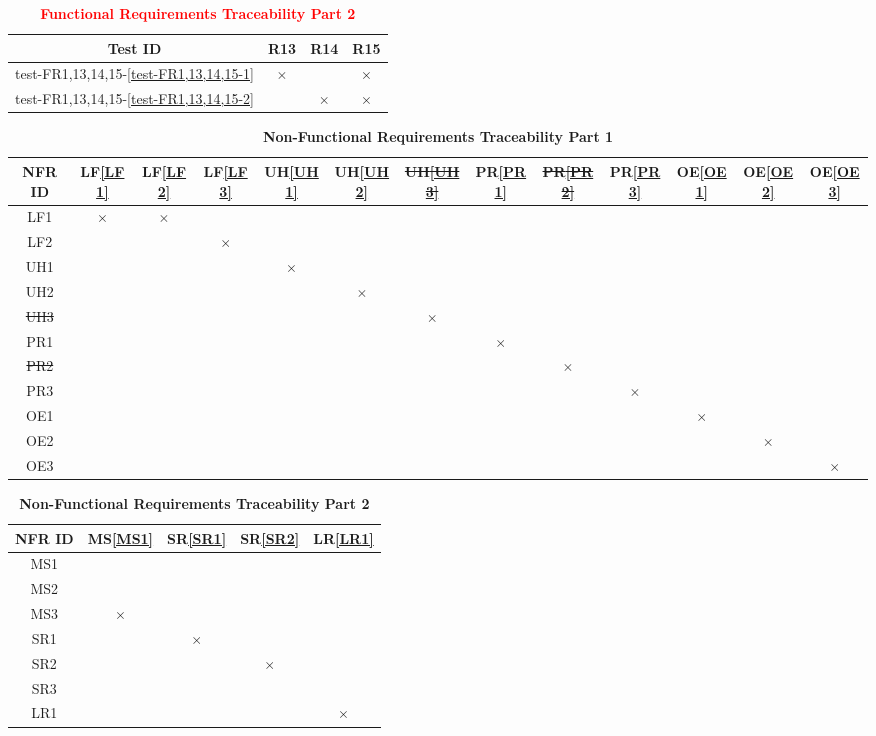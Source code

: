 \documentclass[12pt, titlepage]{article}
\begin{document}
\begin{table}[H]
\centering
\begin{tabular}{|c|c|c|c|}
\hline
Test ID & R13 & R14 & R15 \\
\hline 
test-FR1,13,14,15-\ref{test-FR1,13,14,15-1} & $\times$ & & $\times$ \\
\hline
test-FR1,13,14,15-\ref{test-FR1,13,14,15-2} & & $\times$ & $\times$ \\
\hline
\end{tabular}
\caption{\bf \textcolor{red}{Functional Requirements Traceability Part 2}}
\end{table}

\begin{table}[H]
\centering
\begin{tabular}{|c|c|c|c|c|c|c|c|c|c|c|c|c|}
\hline
 NFR ID & LF\ref{LF1} & LF\ref{LF2} & LF\ref{LF3} & UH\ref{UH1} & UH\ref{UH2} & \color{red}\sout{UH\ref{UH3}} & PR\ref{PR1} & \color{red}\sout{PR\ref{PR2}} & PR\ref{PR3} & OE\ref{OE1} & OE\ref{OE2} & OE\ref{OE3} \\
\hline
LF1 & $\times$ & $\times$ & & & & & & & & & &\\
\hline
LF2 &  &  & $\times$ & & & & & & & & &\\
\hline
UH1&  & & &$\times$ &  & & & & & & &\\
\hline
UH2 & & & & & $\times$& & & & & & &\\
\hline
\color{red}\sout{UH3} & & & & & &\color{red}\sout{$\times$} & & & & & & \\
\hline
PR1 &  & & & & & & $\times$ & & & & &\\
\hline
\color{red}\sout{PR2} &  & & & & & & & \color{red}\sout{$\times$} & & & &\\
\hline
PR3 &  & & & & & & & & $\times$ & & &\\
\hline
OE1 &  & & & & & & & & & $\times$& &\\
\hline
OE2 &  & & & & & & & & & & $\times$ & \\
\hline
OE3 &  & & & & & & & & & & & $\times$ \\
\hline
\end{tabular}
\caption{\bf Non-Functional Requirements Traceability Part 1}
\end{table}

\begin{table}[H]
\centering
\begin{tabular}{|c|c|c|c|c|}
\hline
NFR ID & MS\ref{MS1} & SR\ref{SR1} & SR\ref{SR2} & LR\ref{LR1} \\
\hline 
MS1 & & & & \\
\hline
MS2 & & & & \\
\hline
MS3 & $\times$ & & & \\
\hline
SR1 & & $\times$& & \\
\hline
SR2 & & & $\times$&  \\
\hline
SR3 & & & & \\
\hline
LR1 & & & & $\times$ \\
\hline
\end{tabular}
\caption{\bf Non-Functional Requirements Traceability Part 2}
\end{table}
\end{document}
